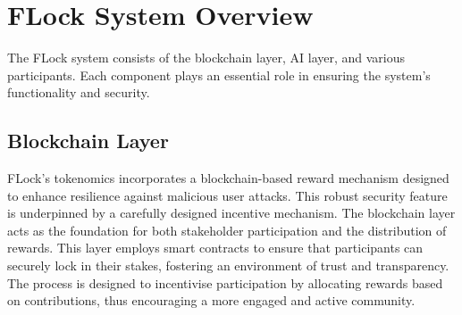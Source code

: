 \documentclass[conference]{IEEEtran}
\begin{document}







\section{FLock System Overview}
The FLock system consists of the blockchain layer, AI layer, and various participants. Each component plays an essential role in ensuring the system's functionality and security.





\subsection{Blockchain Layer}
FLock's tokenomics incorporates a blockchain-based reward mechanism designed to enhance resilience against malicious user attacks.  This robust security feature is underpinned by a carefully designed incentive mechanism.
The blockchain layer acts as the foundation for both stakeholder participation and the distribution of rewards. This layer employs smart contracts to ensure that participants can securely lock in their stakes, fostering an environment of trust and transparency. The process is designed to incentivise participation by allocating rewards based on contributions, thus encouraging a more engaged and active community.
\end{document}
